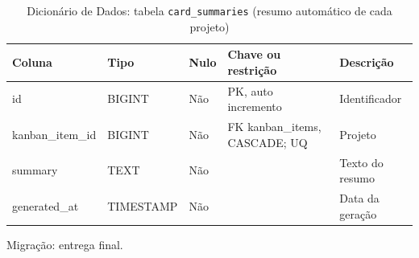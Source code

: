 \begin{table}[H]
\centering
\footnotesize
\caption{Dicionário de Dados: tabela \texttt{card\_\allowbreak{}summaries} (resumo automático de cada projeto)}
\label{tab:dd-card-summaries}
\begin{tabular}{|>{\raggedright\arraybackslash}p{3.0cm}|>{\raggedright\arraybackslash}p{3.2cm}|>{\centering\arraybackslash}p{0.8cm}|>{\raggedright\arraybackslash}p{3.0cm}|>{\raggedright\arraybackslash}p{3.8cm}|}
\hline
\textbf{Coluna} & \textbf{Tipo} & \textbf{Nulo} & \textbf{Chave ou restrição} & \textbf{Descrição} \\
\hline
id & BIGINT & Não & PK, auto incremento & Identificador \\
\hline
kanban\_\allowbreak{}item\_\allowbreak{}id & BIGINT & Não & FK kanban\_\allowbreak{}items, CASCADE; UQ & Projeto \\
\hline
summary & TEXT & Não &  & Texto do resumo \\
\hline
generated\_\allowbreak{}at & TIMESTAMP & Não &  & Data da geração \\
\hline
\end{tabular}
\par\footnotesize Migração: entrega final.
\end{table}

